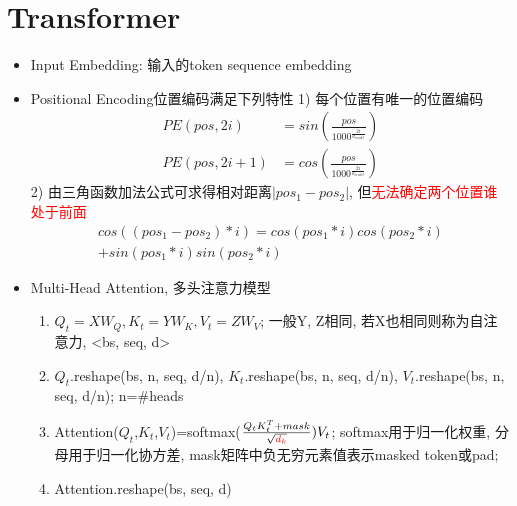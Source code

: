 \section{Transformer}\label{model:Transformer}

\begin{multicols}{2} 
    
    
    \begin{itemize}
        \justifying
        \item Input Embedding: 输入的token sequence embedding
        
        \item Positional Encoding位置编码满足下列特性
        1) 每个位置有唯一的位置编码
        \begin{align}
            PE(pos,2i)&=sin(\frac{pos}{1000^\frac{2i}{d_{model}}})\\
            PE(pos,2i+1)&=cos(\frac{pos}{1000^\frac{2i}{d_{model}}})
        \end{align}
        2) 由三角函数加法公式可求得相对距离$|pos_1-pos_2|$, 但\textcolor{red}{无法确定两个位置谁处于前面}
        \begin{equation}
            \begin{split}
                cos((pos_1-pos_2)*i)=cos(pos_1*i)cos(pos_2*i)\\
                +sin(pos_1*i)sin(pos_2*i)
            \end{split}
        \end{equation}
        
        \item Multi-Head Attention, 多头注意力模型
            \begin{enumerate}
                \item $Q_t=XW_Q, K_t=YW_K, V_t=ZW_V$; 一般Y, Z相同, 若X也相同则称为自注意力, <bs, seq, d>
                \item $Q_t$.reshape(bs, n, seq, d/n), $K_t$.reshape(bs, n, seq, d/n), $V_t$.reshape(bs, n, seq, d/n); n=\#heads
                \item Attention($Q_t$,$K_t$,$V_t$)=softmax($\frac{Q_tK_t^T + mask}{\sqrt{\textcolor{red}{d_k}}})V_t$; softmax用于归一化权重, 分母用于归一化协方差, mask矩阵中负无穷元素值表示masked token或pad; 
                \item Attention.reshape(bs, seq, d) 
            \end{enumerate}
        

\end{itemize}
\end{multicols}
